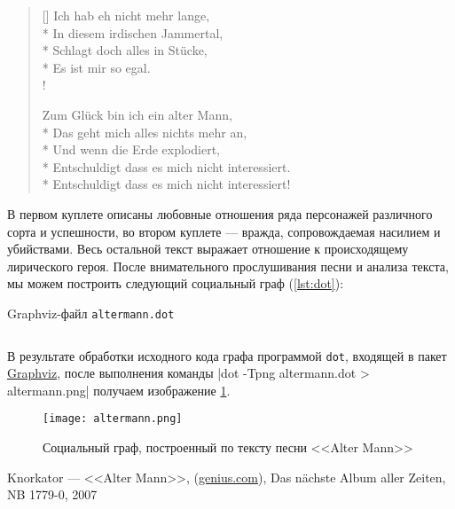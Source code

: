 \documentclass[a4paper,12pt,notitlepage]{article}
\begin{document}
\begin{verse}[\versewidth]
		Ich hab eh nicht mehr lange, \\*
		In diesem irdischen Jammertal, \\*
		Schlagt doch alles in Stücke, \\*
		Es ist mir so egal. \\!
		
		Zum Glück bin ich ein alter Mann, \\*
		Das geht mich alles nichts mehr an, \\*
		Und wenn die Erde explodiert, \\*
		Entschuldigt dass es mich nicht interessiert. \\*
		Entschuldigt dass es mich nicht interessiert! \\
  \end{verse}
  
  В первом куплете описаны любовные отношения ряда персонажей различного сорта и успешности, во втором куплете --- вражда, сопровождаемая насилием и убийствами. Весь остальной текст выражает отношение к происходящему лирического героя. После внимательного прослушивания песни и анализа текста, мы можем построить следующий социальный граф (\ref{lst:dot}):
  
  \begin{listing}[H]
    \caption{Graphviz-файл \texttt{altermann.dot}}
    \label{lst:dot}
    \inputminted[linenos,fontsize=\small]{dot}{altermann.dot}
  \end{listing}
    
  \newpage

  В результате обработки исходного кода графа программой \texttt{dot}, входящей в пакет \href{https://http://www.graphviz.org/}{Graphviz}, после выполнения команды |dot -Tpng altermann.dot > altermann.png| получаем изображение \ref{fig:graph}.
    
  \begin{figure}[ht]
    \centering
    \texttt{[image: altermann.png]}
    \caption{Социальный граф, построенный по тексту песни <<Alter Mann>>}
    \label{fig:graph}
  \end{figure}
    
  \newpage

  \listoflistings

  \listoffigures

  \begin{thebibliography}{1}
    Knorkator --- <<Alter Mann>>, (\href{https://genius.com/Knorkator-alter-mann-lyrics}{genius.com}), Das nächste Album aller Zeiten, NB 1779-0, 2007
  \end{thebibliography}
      
\end{document}

